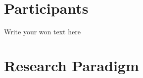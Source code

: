 \documentclass[11pt, a4paper]{article}
\begin{document}
\section*{Participants}

Write your won text here

\section*{Research Paradigm}
\end{document}
